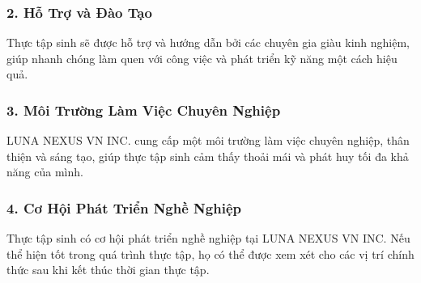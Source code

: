 \begin{flushleft}
		\subsubsection*{2. Hỗ Trợ và Đào Tạo}
		\fontsize{16}{13}\selectfont Thực tập sinh sẽ được hỗ trợ và hướng dẫn bởi các chuyên gia giàu kinh nghiệm, giúp nhanh chóng làm quen với công việc và phát triển kỹ năng một cách hiệu quả.

		\subsubsection*{3. Môi Trường Làm Việc Chuyên Nghiệp}
		\fontsize{16}{13}\selectfont LUNA NEXUS VN INC. cung cấp một môi trường làm việc chuyên nghiệp, thân thiện và sáng tạo, giúp thực tập sinh cảm thấy thoải mái và phát huy tối đa khả năng của mình.

		\subsubsection*{4. Cơ Hội Phát Triển Nghề Nghiệp}
		\fontsize{16}{13}\selectfont Thực tập sinh có cơ hội phát triển nghề nghiệp tại LUNA NEXUS VN INC. Nếu thể hiện tốt trong quá trình thực tập, họ có thể được xem xét cho các vị trí chính thức sau khi kết thúc thời gian thực tập.
	\end{flushleft}
		\pagebreak
